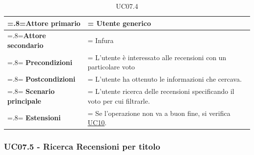             \begin{table}[H]
                \centering
                \renewcommand{\arraystretch}{1.8}
                \renewcommand\tabularxcolumn[1]{m{#1}}
                \begin{tabularx}{0.9\textwidth} {
                    >{\hsize=.8\hsize\linewidth=\hsize}X
                    >{\hsize=1.2\hsize\linewidth=\hsize}X}
                    \hline
                    \textbf{Attore primario} & Utente generico \\
                    \hline
                    \textbf{Attore secondario} & Infura \\
                    \hline
                    \textbf{Precondizioni} & L'utente è interessato alle recensioni con un particolare voto \\
                    \hline
                    \textbf{Postcondizioni} & L'utente ha ottenuto le informazioni che cercava. \\
                    \hline
                    \textbf{Scenario principale} & L'utente ricerca delle recensioni specificando il voto per cui filtrarle.\\
                    \hline
                    \textbf{Estensioni} & Se l'operazione non va a buon fine, si verifica \hyperref[UC10]{UC10}. \\
                    \hline
                \end{tabularx}
                \caption{UC07.4}
            \end{table}

        \subsubsection{UC07.5 - Ricerca Recensioni per titolo}
        \label{UC07.5}

